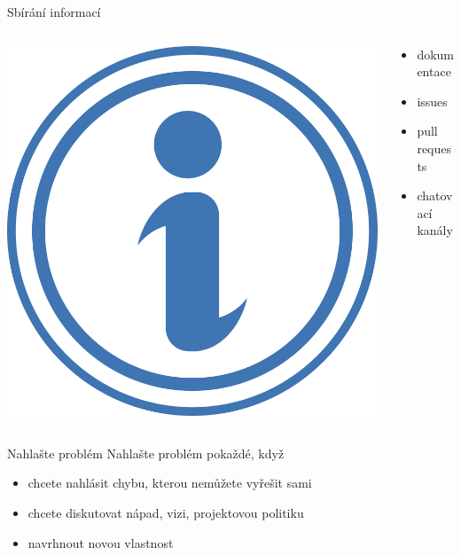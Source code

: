 \documentclass[11pt]{beamer}
\begin{document}
\begin{frame}{Sbírání informací}
		\begin{columns}[T]
	\begin{column}{0.5\textwidth}
		\includegraphics[width=\textwidth]{images/info.png}
	\end{column}
	
	\begin{column}{0.5\textwidth}
	\begin{itemize}
	\item dokumentace
	\item issues
	\item pull requests
	\item chatovací kanály
\end{itemize}
	\end{column}
\end{columns}	
\end{frame}

\begin{frame}{Nahlašte problém}
	Nahlašte problém pokaždé, když
	\begin{itemize}
		\item chcete nahlásit chybu, kterou nemůžete vyřešit sami
		\item chcete diskutovat nápad, vizi, projektovou politiku
		\item navrhnout novou vlastnost 
	\end{itemize}
\end{frame}
\end{document}
